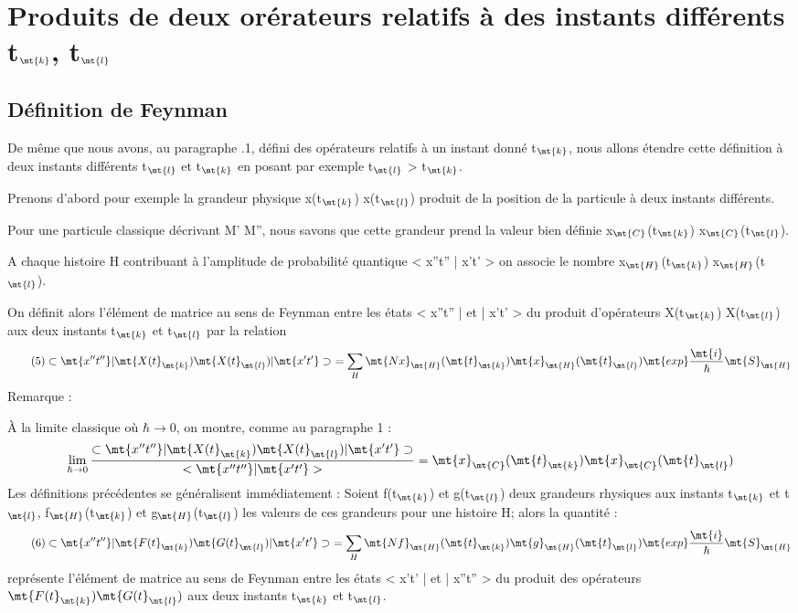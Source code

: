 \section{Produits de deux orérateurs relatifs à des instants différents t$_\mt{k}$, t$_\mt{l}$}%
\subsection{Définition de Feynman}%

De même que nous avons, au paragraphe .1, défini des opérateurs
relatifs à un instant donné t$_\mt{k}$, nous allons étendre cette définition à deux
instants différents t$_\mt{l}$ et t$_\mt{k}$ en posant par exemple t$_\mt{l}$ > t$_\mt{k}$.

Prenons d'abord pour exemple la grandeur physique x(t$_\mt{k}$) x(t$_\mt{l}$)
produit de la position de la particule à deux instants différents.

Pour une particule classique décrivant M' M'', nous savons que
cette grandeur prend la valeur bien définie  x$_\mt{C}$(t$_\mt{k}$) x$_\mt{C}$(t$_\mt{l}$).

A chaque histoire H contribuant à l'amplitude de probabilité
quantique < x''t'' | x't' > on associe le nombre x$_\mt{H}$(t$_\mt{k}$) x$_\mt{H}$(t$_\mt{l}$).

On définit alors l'élément de matrice au sens de Feynman entre
les états < x''t'' | et | x't' > du produit d'opérateurs X(t$_\mt{k}$) X(t$_\mt{l}$) aux
deux instants t$_\mt{k}$ et t$_\mt{l}$ par la relation
\[
\tag{5}\subset \mt{x''t''} | \mt{X(t}_\mt{k}) \mt{ X(t}_\mt{l}) | \mt{x't'}\supset\ =
\sum_H \mt{N x}_\mt{H}(\mt{t}_\mt{k}) \mt{ x}_\mt{H}(\mt{t}_\mt{l})
\mt{ exp}\frac{\mt{i}}{\hbar}\mt{S}_\mt{H}
\]
Remarque :

À la limite classique où $\hbar \to 0$, on montre, comme au paragraphe 1 :
$$ \lim_{\hbar \to 0} \frac{\subset \mt{x''t''} | \mt{X(t}_\mt{k}) \mt{ X(t}_\mt{l}) | \mt{x't'}\supset}
{< \mt{x''t''} | \mt{x't'}>} = \mt{ x}_\mt{C}(\mt{t}_\mt{k}) \mt{ x}_\mt{C}(\mt{t}_\mt{l})$$
Les définitions précédentes se généralisent immédiatement :
Soient f(t$_\mt{k}$) et g(t$_\mt{l}$) deux grandeurs rhysiques aux instants t$_\mt{k}$ et t$_\mt{l}$,
f$_\mt{H}$(t$_\mt{k}$) et g$_\mt{H}$(t$_\mt{l}$) les valeurs de ces grandeurs pour une histoire H; alors
la quantité :
\[
\tag{6}\subset \mt{x''t''} | \mt{F(t}_\mt{k}) \mt{ G(t}_\mt{l}) | \mt{x't'}\supset\ =
\sum_H \mt{N f}_\mt{H}(\mt{t}_\mt{k}) \mt{ g}_\mt{H}(\mt{t}_\mt{l})
\mt{ exp}\frac{\mt{i}}{\hbar}\mt{S}_\mt{H}
\]
représente l'élément de matrice au sens de Feynman entre les états < x't' |
et | x''t'' > du produit des opérateurs $\mt{F(t}_\mt{k}) \mt{ G(t}_\mt{l})$ aux deux instants t$_\mt{k}$
et t$_\mt{l}$.

